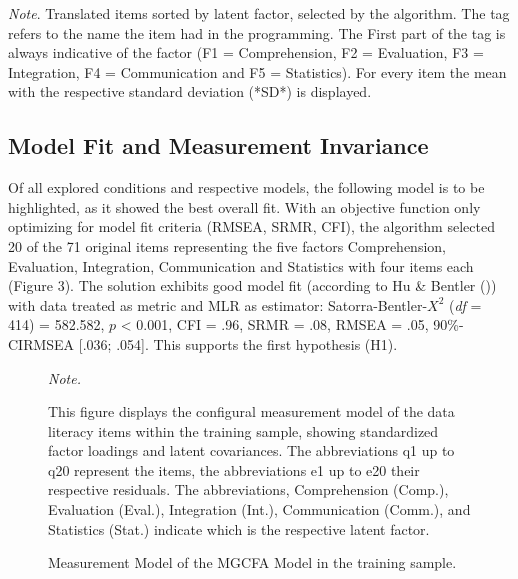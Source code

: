 \documentclass[
  12pt,
  a4paper,
  twoside]{article}
\begin{document}
\begin{table}[htpb]
\vspace{10pt}
\small\textit{Note}. Translated items sorted by latent factor, selected by the algorithm. 
The tag refers to the name the item had in the programming. The First part of the tag is always indicative of the factor (F1 = Comprehension, F2 = Evaluation, F3 = Integration, F4 = Communication and F5 = Statistics). For every item the mean with the respective standard deviation (*SD*) is displayed.
\end{table}

\subsection{Model Fit and Measurement Invariance}\label{model-fit-and-measurement-invariance}

Of all explored conditions and respective models, the following model is to be highlighted, as it showed the best overall fit.
With an objective function only optimizing for model fit criteria (RMSEA, SRMR, CFI), the algorithm selected 20 of the 71 original items representing the five factors Comprehension, Evaluation, Integration, Communication and Statistics with four items each (Figure 3). The solution exhibits good model fit (according to Hu \& Bentler ()) with data treated as metric and MLR as estimator: Satorra-Bentler-\(X^{2}\) (\emph{df} = 414) = 582.582, \(p\) \textless{} 0.001, CFI = .96, SRMR = .08, RMSEA = .05, 90\%-CIRMSEA {[}.036; .054{]}. This supports the first hypothesis (H1).

\vspace{0.3cm}
\begin{figure}
    \centering
    \caption{Measurement Model of the MGCFA Model in the training sample.}
    \small 
    \textit{Note.} \raggedright This figure displays the configural measurement model of the data literacy items within the training sample, showing standardized factor loadings and latent covariances. The abbreviations q1 up to q20 represent the items, the abbreviations e1 up to e20 their respective residuals. The abbreviations, Comprehension (Comp.), Evaluation (Eval.), Integration (Int.), Communication (Comm.), and Statistics (Stat.) indicate which is the respective latent factor.
\end{figure}
\vspace{0.3cm}
\end{document}
